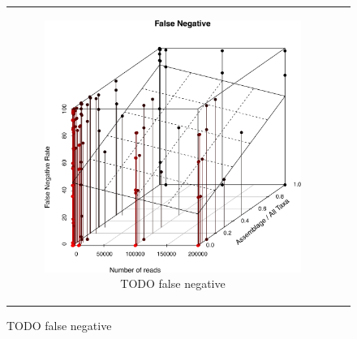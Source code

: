 \begin{figure}
\centering

\begin{tabular}{cc}

\begin{subfigure}[b]{0.5\textwidth}
\centering
\includegraphics[width=\textwidth]{../polarfront/falsenegative.png}
\caption{TODO false negative}
\label{fig:minspecvalidationfalsenegative}
\end{subfigure}%

&


\end{tabular}
\end{figure}
